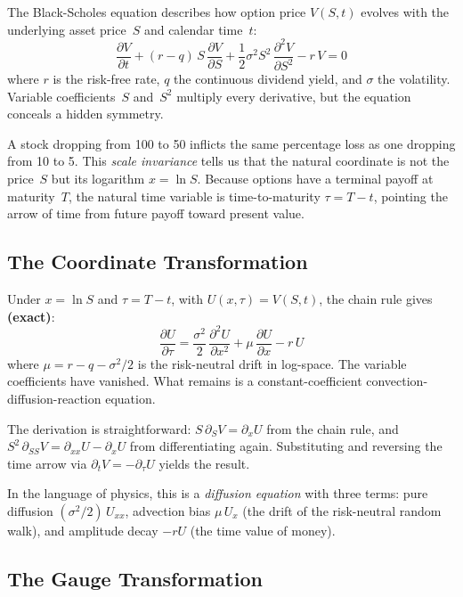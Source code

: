 The Black-Scholes equation describes how option price $V(S, t)$ evolves with the underlying asset price~$S$ and calendar time~$t$:
\begin{equation}\label{eq:bs-original}
  \frac{\partial V}{\partial t}
  + (r - q)\,S\,\frac{\partial V}{\partial S}
  + \frac{1}{2}\sigma^2 S^2\,\frac{\partial^2 V}{\partial S^2}
  - r\,V = 0
\end{equation}
where $r$ is the risk-free rate, $q$ the continuous dividend yield, and $\sigma$ the volatility.  Variable coefficients~$S$ and~$S^2$ multiply every derivative, but the equation conceals a hidden symmetry.

A stock dropping from 100 to 50 inflicts the same percentage loss as one dropping from 10 to 5.  This \emph{scale invariance} tells us that the natural coordinate is not the price~$S$ but its logarithm $x = \ln S$.  Because options have a terminal payoff at maturity~$T$, the natural time variable is time-to-maturity $\tau = T - t$, pointing the arrow of time from future payoff toward present value.

\subsection{The Coordinate Transformation}

Under $x = \ln S$ and $\tau = T - t$, with $U(x, \tau) = V(S, t)$, the chain rule gives \textbf{(exact)}:
\begin{equation}\label{eq:bs-logspace}
  \frac{\partial U}{\partial \tau}
  = \frac{\sigma^2}{2}\,\frac{\partial^2 U}{\partial x^2}
  + \mu\,\frac{\partial U}{\partial x}
  - r\,U
\end{equation}
where $\mu = r - q - \sigma^2/2$ is the risk-neutral drift in log-space.  The variable coefficients have vanished.  What remains is a constant-coefficient convection-diffusion-reaction equation.

The derivation is straightforward: $S\,\partial_S V = \partial_x U$ from the chain rule, and $S^2\,\partial_{SS} V = \partial_{xx} U - \partial_x U$ from differentiating again.  Substituting and reversing the time arrow via $\partial_t V = -\partial_\tau U$ yields the result.

In the language of physics, this is a \emph{diffusion equation} with three terms: pure diffusion $(\sigma^2/2)\,U_{xx}$, advection bias $\mu\,U_x$ (the drift of the risk-neutral random walk), and amplitude decay $-rU$ (the time value of money).

\subsection{The Gauge Transformation}

